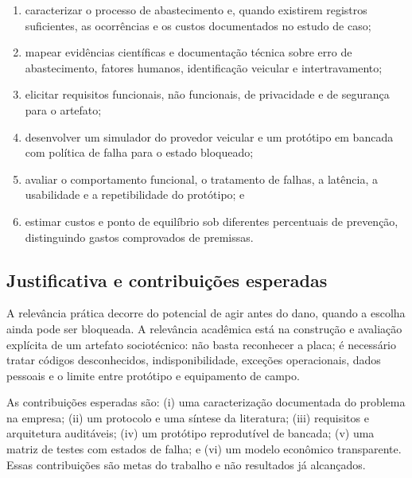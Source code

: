 \begin{enumerate}
  \item caracterizar o processo de abastecimento e, quando existirem registros
  suficientes, as ocorrências e os custos documentados no estudo de caso;
  \item mapear evidências científicas e documentação técnica sobre erro de
  abastecimento, fatores humanos, identificação veicular e intertravamento;
  \item elicitar requisitos funcionais, não funcionais, de privacidade e de
  segurança para o artefato;
  \item desenvolver um simulador do provedor veicular e um protótipo em bancada
  com política de falha para o estado bloqueado;
  \item avaliar o comportamento funcional, o tratamento de falhas, a latência,
  a usabilidade e a repetibilidade do protótipo; e
  \item estimar custos e ponto de equilíbrio sob diferentes percentuais de
  prevenção, distinguindo gastos comprovados de premissas.
\end{enumerate}

\subsection{Justificativa e contribuições esperadas}

A relevância prática decorre do potencial de agir antes do dano, quando a
escolha ainda pode ser bloqueada. A relevância acadêmica está na construção e
avaliação explícita de um artefato sociotécnico: não basta reconhecer a placa;
é necessário tratar códigos desconhecidos, indisponibilidade, exceções
operacionais, dados pessoais e o limite entre protótipo e equipamento de campo.

As contribuições esperadas são: (i) uma caracterização documentada do problema
na empresa; (ii) um protocolo e uma síntese da literatura; (iii) requisitos e
arquitetura auditáveis; (iv) um protótipo reprodutível de bancada; (v) uma matriz
de testes com estados de falha; e (vi) um modelo econômico transparente. Essas
contribuições são metas do trabalho e não resultados já alcançados.
